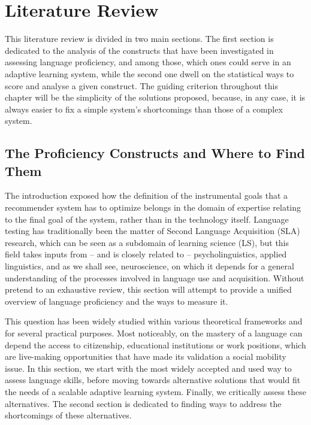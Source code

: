 \chapter{Literature Review}

This literature review is divided in two main sections. The first section is dedicated to the analysis of the constructs that have been investigated in assessing language proficiency, and among those, which ones could serve in an adaptive learning system, while the second one dwell on the statistical ways to score and analyse a given construct. The guiding criterion throughout this chapter will be the simplicity of the solutions proposed, because, in any case, it is always easier to fix a simple system's shortcomings than those of a complex system.

\section{The Proficiency Constructs and Where to Find Them}
The introduction exposed how the definition of the instrumental goals that a recommender system has to optimize belongs in the domain of expertise relating to the final goal of the system, rather than in the technology itself. Language testing has traditionally been the matter of Second Language Acquisition (SLA) research, which can be seen as a subdomain of learning science (LS), but this field takes inputs from – and is closely related to – psycholinguistics, applied linguistics, and as we shall see, neuroscience, on which it depends for a general understanding of the processes involved in language use and acquisition. Without pretend to an exhaustive review, this section will attempt to provide a unified overview of language proficiency and the ways to measure it.

This question has been widely studied within various theoretical frameworks and for several practical purposes. Most noticeably, on the mastery of a language can depend the access to citizenship, educational institutions or work positions, which are live-making opportunities that have made its validation a social mobility issue. In this section, we start with the most widely accepted and used way to assess language skills, before moving towards alternative solutions that would fit the needs of a scalable adaptive learning system. Finally, we critically assess these alternatives. The second section is dedicated to finding ways to address the shortcomings of these alternatives.

